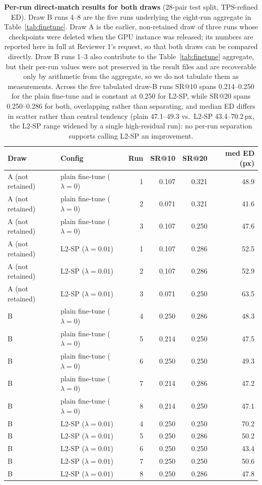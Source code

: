 \documentclass[fleqn,10pt]{wlscirep}
\begin{document}
\begin{table}[ht]
\centering
\begin{tabular}{llrrrr}
\hline
Draw & Config & Run & SR@10 & SR@20 & med ED (px) \\
\hline
A (not retained) & plain fine-tune ($\lambda{=}0$) & 1 & 0.107 & 0.321 & 48.9 \\
A (not retained) & plain fine-tune ($\lambda{=}0$) & 2 & 0.071 & 0.321 & 41.6 \\
A (not retained) & plain fine-tune ($\lambda{=}0$) & 3 & 0.107 & 0.250 & 47.6 \\
A (not retained) & L2-SP ($\lambda{=}0.01$)        & 1 & 0.107 & 0.286 & 52.5 \\
A (not retained) & L2-SP ($\lambda{=}0.01$)        & 2 & 0.107 & 0.286 & 52.9 \\
A (not retained) & L2-SP ($\lambda{=}0.01$)        & 3 & 0.071 & 0.250 & 63.5 \\
\hline
B & plain fine-tune ($\lambda{=}0$) & 4 & 0.250 & 0.286 & 48.3 \\
B & plain fine-tune ($\lambda{=}0$) & 5 & 0.214 & 0.250 & 47.5 \\
B & plain fine-tune ($\lambda{=}0$) & 6 & 0.250 & 0.250 & 49.3 \\
B & plain fine-tune ($\lambda{=}0$) & 7 & 0.214 & 0.286 & 47.2 \\
B & plain fine-tune ($\lambda{=}0$) & 8 & 0.214 & 0.250 & 47.1 \\
B & L2-SP ($\lambda{=}0.01$)        & 4 & 0.250 & 0.250 & 70.2 \\
B & L2-SP ($\lambda{=}0.01$)        & 5 & 0.250 & 0.286 & 50.2 \\
B & L2-SP ($\lambda{=}0.01$)        & 6 & 0.250 & 0.250 & 43.4 \\
B & L2-SP ($\lambda{=}0.01$)        & 7 & 0.250 & 0.250 & 50.6 \\
B & L2-SP ($\lambda{=}0.01$)        & 8 & 0.250 & 0.286 & 47.8 \\
\hline
\end{tabular}
\caption{\textbf{Per-run direct-match results for both draws} (28-pair test split, TPS-refined ED). Draw B runs 4--8 are the five runs underlying the eight-run aggregate in Table~\ref{tab:finetune}. Draw A is the earlier, non-retained draw of three runs whose checkpoints were deleted when the GPU instance was released; its numbers are reported here in full at Reviewer 1's request, so that both draws can be compared directly. Draw B runs 1--3 also contribute to the Table~\ref{tab:finetune} aggregate, but their per-run values were not preserved in the result files and are recoverable only by arithmetic from the aggregate, so we do not tabulate them as measurements. Across the five tabulated draw-B runs SR@10 spans 0.214--0.250 for the plain fine-tune and is constant at 0.250 for L2-SP, while SR@20 spans 0.250--0.286 for both, overlapping rather than separating, and median ED differs in scatter rather than central tendency (plain 47.1--49.3 vs.\ L2-SP 43.4--70.2\,px, the L2-SP range widened by a single high-residual run): no per-run separation supports calling L2-SP an improvement.}
\label{tab:seeds}
\end{table}
\end{document}
